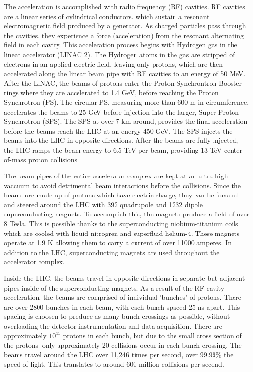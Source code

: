 The acceleration is accomplished with radio frequency
(RF) cavities. RF cavities are a linear series of cylindrical conductors,
which sustain a resonant electromagnetic field produced by a generator. As 
charged particles pass through the cavities, they experience a force
(acceleration) from the resonant alternating field in each cavity. This acceleration process begins with Hydrogen gas in the linear accelerator
(LINAC 2). The Hydrogen atoms in the gas are stripped of electrons
in an applied electric field, leaving only protons, which are then accelerated
along the linear beam pipe with RF cavities to an energy of 50 MeV. After the LINAC, the beams of protons enter the Proton Synchrontron Booster rings where
they are accelerated to 1.4 GeV, before reaching the Proton
Synchrotron (PS). The circular PS, measuring more than 600 m
in circumference, accelerates the beams to 25 GeV before injection into the
larger, Super Proton Synchrotron (SPS). The SPS at over 7 km around, provides the final
acceleration before the beams reach the LHC at an energy 450 GeV. The SPS injects the beams into
the LHC in opposite directions. After the beams are fully injected, the LHC ramps the beam energy to 6.5 TeV per beam, providing 13 TeV center-of-mass proton collisions.

The beam pipes of the entire accelerator complex are kept at an ultra high vaccuum
to avoid detrimental beam interactions before the collisions. Since the beams are made up of protons which have electric charge,
they can be focused and steered around the LHC with 392 quadrupole and 1232 dipole superconducting magnets.
To accomplish this, the magnets produce a field of over 8 Tesla. This is possible thanks to the
superconducting niobium-titanium coils which are cooled with liquid nitrogren and superfluid helium-4. These
magnets operate at 1.9 K allowing them to carry a current of over 11000 amperes. In addition to
the LHC, superconducting magnets are used throughout the accelerator complex.

Inside the LHC, the beams travel in opposite directions in separate but adjacent pipes inside of the superconducting magnets.
As a result of the RF cavity acceleration, the beams are comprised of individual 'bunches' of protons.
There are over 2800 bunches in each beam, with each bunch spaced 25 ns apart. This spacing is choosen to
produce as many bunch crossings as possible, without overloading
the detector instrumentation and data acquisition. There are approximately $10^{11}$ protons in each bunch, but due to the small cross section of the protons,
only approximately 20 collisions occur in each bunch crossing. The beams travel around the LHC over 11,246 times per second, over 99.99$\%$ the speed of light. 
This translates to around 600 million collisions per second.


